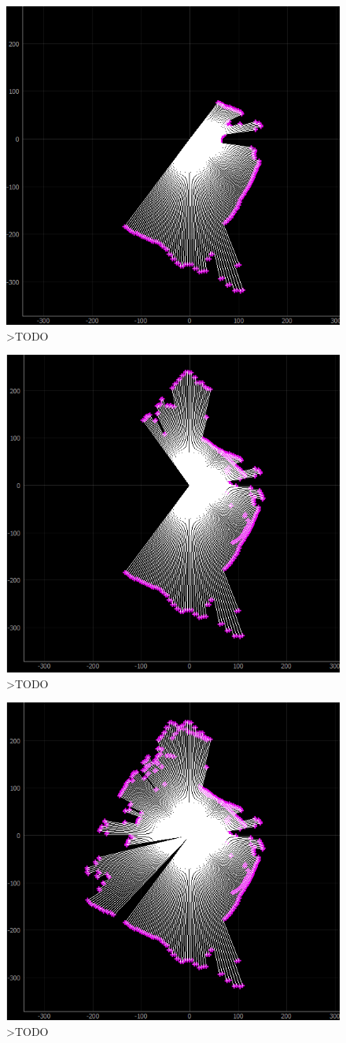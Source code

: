 \begin{figure}[ht]
	\centering
		\includegraphics[width=0.5\linewidth]{rys/ScanBot-12-calibrated-room-map1.PNG}
	\caption{>TODO}
	\label{fig:xxx}
\end{figure}

\begin{figure}[ht]
	\centering
		\includegraphics[width=0.5\linewidth]{rys/ScanBot-12-calibrated-room-map2.PNG}
	\caption{>TODO}
	\label{fig:xxx}
\end{figure}

\begin{figure}[ht]
	\centering
		\includegraphics[width=0.5\linewidth]{rys/ScanBot-12-calibrated-room-map3.PNG}
	\caption{>TODO}
	\label{fig:xxx}
\end{figure}


